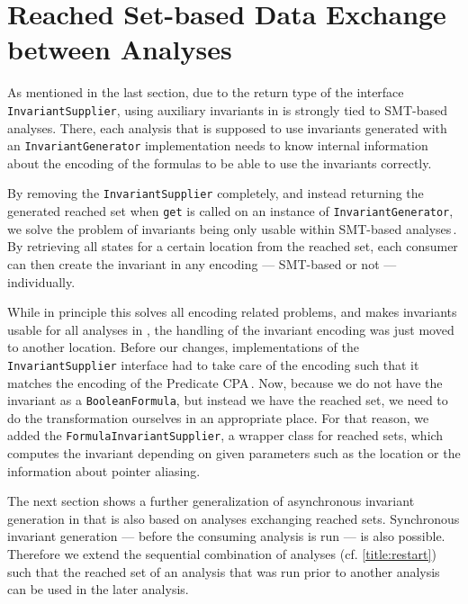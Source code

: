 \section{Reached Set-based Data Exchange between Analyses}\label{title:concept_reached}
As mentioned in the last section, due to the return type of the interface \texttt{InvariantSupplier}, using auxiliary invariants in \CPAchecker{} is strongly tied to \ac{SMT}-based analyses.
There, each analysis that is supposed to use invariants generated with an \texttt{InvariantGenerator} implementation needs to know internal information about the encoding of the formulas
to be able to use the invariants correctly.

By removing the \texttt{InvariantSupplier} completely, and instead returning the generated reached set when \texttt{get} is called on an instance of \texttt{InvariantGenerator}, we solve
the problem of invariants being only usable within \ac{SMT}-based analyses\,. By retrieving all states for a certain location from the reached set, each consumer can then 
create the invariant in any encoding --- \ac{SMT}-based or not --- individually.

While in principle this solves all encoding related problems, and makes invariants usable for all analyses in \CPAchecker{}, the handling of the invariant encoding was just moved 
to another location. Before our changes, implementations of the \texttt{InvariantSupplier} interface had to take care of the encoding such that it matches the encoding of the Predicate 
CPA\,. Now, because we do not have the invariant as a \texttt{BooleanFormula}, but instead 
we have the reached set, we need to do the transformation ourselves in an appropriate place. For that reason, we added the \texttt{FormulaInvariantSupplier}, a wrapper class for reached 
sets, which computes the invariant depending on given parameters such as the location or the information about pointer aliasing.

The next section shows a further generalization of asynchronous invariant generation in \CPAchecker{} that is also based on analyses exchanging reached sets.
Synchronous invariant generation --- before the consuming analysis is run --- is also possible. Therefore we extend the sequential combination of analyses
(cf. \autoref{title:restart}) such that the reached set of an analysis that was run prior to another analysis can be used in the later analysis.

